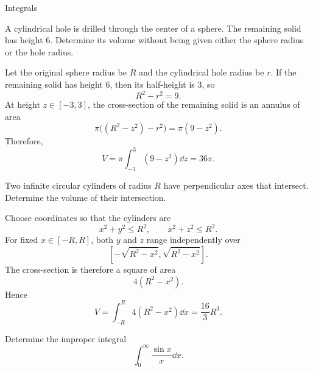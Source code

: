 \begin{expectedproblemgroup}{Integrals}
        \begin{expectedsubproblem}
            A cylindrical hole is drilled through the center of a sphere. The
            remaining solid has height $6$. Determine its volume without being
            given either the sphere radius or the hole radius.
        \end{expectedsubproblem}

        \begin{expectedsubsolution}
            Let the original sphere radius be $R$ and the cylindrical hole radius
            be $r$. If the remaining solid has height $6$, then its half-height is
            $3$, so
            \[
                R^2-r^2=9.
            \]
            At height $z\in[-3,3]$, the cross-section of the remaining solid is an
            annulus of area
            \[
                \pi\bigl((R^2-z^2)-r^2\bigr)
                =
                \pi(9-z^2).
            \]
            Therefore,
            \[
                V
                =
                \pi\int_{-3}^{3}(9-z^2)\dd z
                =
                \boxed{36\pi}.
            \]
        \end{expectedsubsolution}

        \begin{expectedsubproblem}
            Two infinite circular cylinders of radius $R$ have perpendicular
            axes that intersect. Determine the volume of their intersection.
        \end{expectedsubproblem}

        \begin{expectedsubsolution}
            Choose coordinates so that the cylinders are
            \[
                x^2+y^2\leq R^2,
                \qquad
                x^2+z^2\leq R^2.
            \]
            For fixed $x\in[-R,R]$, both $y$ and $z$ range independently over
            \[
                \left[-\sqrt{R^2-x^2},\sqrt{R^2-x^2}\right].
            \]
            The cross-section is therefore a square of area
            \[
                4(R^2-x^2).
            \]
            Hence
            \[
                V
                =
                \int_{-R}^{R}4(R^2-x^2)\dd x
                =
                \boxed{\frac{16}{3}R^3}.
            \]
        \end{expectedsubsolution}

        \begin{expectedsubproblem}
            Determine the improper integral
            \[
                \int_0^{\infty}\frac{\sin x}{x}\dd x.
            \]
        \end{expectedsubproblem}


\end{expectedproblemgroup}
